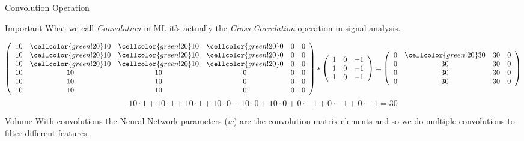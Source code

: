 \begin{frame}{Convolution Operation}
    \begin{alertblock}{Important}
        What we call \textit{Convolution} in ML it's actually the \textit{Cross-Correlation} operation
        in signal analysis.
    \end{alertblock}
    
    \begin{align*}
        \left(
        \begin{array}{cccccc}
            10 & \cellcolor{green!20}10 & \cellcolor{green!20}10 & \cellcolor{green!20}0 & 0 & 0 \\
            10 & \cellcolor{green!20}10 & \cellcolor{green!20}10 & \cellcolor{green!20}0 & 0 & 0 \\
            10 & \cellcolor{green!20}10 & \cellcolor{green!20}10 & \cellcolor{green!20}0 & 0 & 0 \\
            10 & 10 & 10 & 0 & 0 & 0 \\
            10 & 10 & 10 & 0 & 0 & 0 \\
            10 & 10 & 10 & 0 & 0 & 0 \\
        \end{array}
        \right)
        *
        \left(
        \begin{array}{ccc}
            1 & 0 & -1 \\
            1 & 0 & -1 \\ 
            1 & 0 & -1 \\
        \end{array}
        \right)
        = 
        \left(
        \begin{array}{cccc}
            0 & \cellcolor{green!20}30 & 30 & 0 \\
            0 & 30 & 30 & 0 \\
            0 & 30 & 30 & 0 \\
            0 & 30 & 30 & 0 \\
        \end{array}
        \right)
    \end{align*}
    $$
        10 \cdot 1 + 10 \cdot 1 + 10 \cdot 1 +
        10 \cdot 0 + 10 \cdot 0 + 10 \cdot 0 +
        0 \cdot -1 + 0 \cdot -1 + 0 \cdot -1 = 30
    $$
\end{frame}

\begin{frame}{Volume}
    With convolutions the Neural Network parameters ($w$) are the convolution matrix elements
    and so we do multiple convolutions to filter different features.
    
\end{frame}


